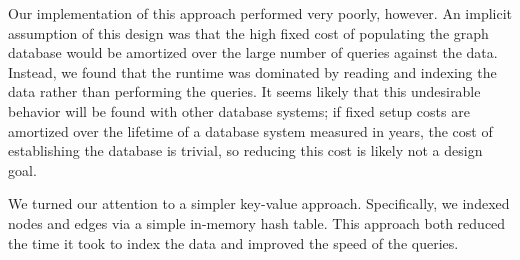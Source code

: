 \documentclass{article}
\begin{document}
Our implementation of this approach performed very poorly, however.
An implicit assumption of this design was that the high fixed cost of
populating the graph database would be amortized over the large number
of queries against the data.  Instead, we found that the runtime was
dominated by reading and indexing the data rather than performing the
queries.  It seems likely that this undesirable behavior will be found
with other database systems; if fixed setup costs are amortized over
the lifetime of a database system measured in years, the cost of
establishing the database is trivial, so reducing this cost is likely
not a design goal.


We turned our attention to a simpler key-value approach.
Specifically, we indexed nodes and edges via a simple in-memory hash
table.  This approach both reduced the time it took to index the data
and improved the speed of the queries.


\end{document}
